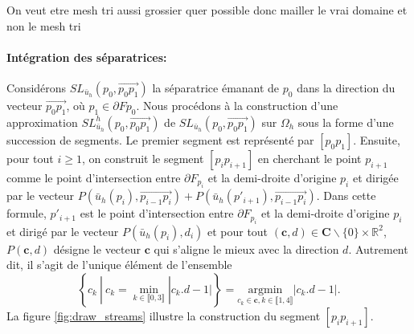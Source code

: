 \color{red}
On veut etre mesh tri aussi grossier quer possible donc mailler le vrai domaine et non le mesh tri
\color{black}

\paragraph{Intégration des séparatrices:} Considérons $SL_{\bar{u}_h}(p_0,\overrightarrow{p_0p_1})$ la séparatrice émanant de $p_0$ dans la direction du vecteur $\overrightarrow{p_0p_1}$, où $p_1\in\partial F{p_0}$. Nous procédons à la construction d'une approximation $SL^h_{\bar{u}_h}(p_0, \overrightarrow{p_0p_1})$ de $SL_{\bar{u}_h}(p_0, \overrightarrow{p_0p_1})$ sur $\Omega_h$ sous la forme d'une succession de segments. Le premier segment est représenté par $[p_0p_1]$. Ensuite, pour tout $i\geq 1$, on construit le segment  $[p_ip_{i+1}]$ en cherchant le point $p_{i+1}$ comme le point d'intersection entre $\partial F_{p_i}$ et la demi-droite d'origine $p_i$ et dirigée par le vecteur $P(\bar{u}_h(p_i), \overrightarrow{p_{i-1}p_i})+P(\bar{u}_h(p'_{i+1}), \overrightarrow{p_{i-1}p_i})$. Dans cette formule, $p'_{i+1}$ est le point d'intersection entre $\partial F_{p_i}$ et la demi-droite d'origine $p_i$ et dirigé par le vecteur $P(\bar{u}_h(p_i), d_i)$ et pour tout $(\mathbf{c},d)\in\mathbf{C}\backslash\{0\}\times\mathbb{R}^2$, $P(\mathbf{c}, d)$ désigne le vecteur $\mathbf{c}$ qui s'aligne le mieux avec la direction $d$. Autrement dit, il s'agit de l'unique élément de l'ensemble
$$
\left\{c_k~ |~ c_k = \displaystyle\min_{k\in\llbracket 0, 3\rrbracket}|c_k.d-1|\right\}=\underset{c_k\in\mathbf{c},k\in\llbracket1, 4\rrbracket}{\mathrm{argmin}}|c_k.d-1|.
$$
La figure \ref{fig:draw_streams} illustre la construction du segment $[p_ip_{i+1}]$.

